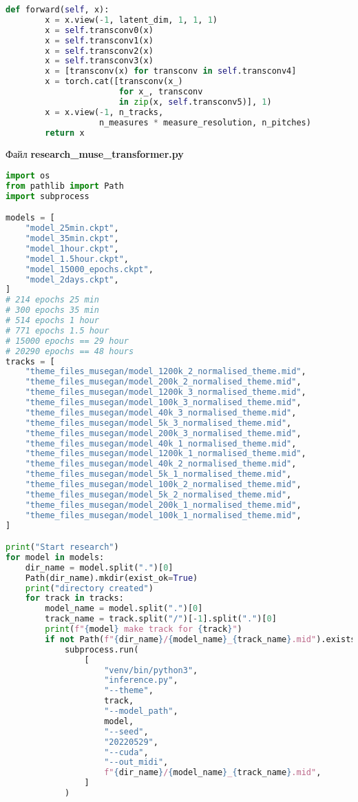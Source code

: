 \begin{lstlisting}[language=Python]
    def forward(self, x):
        x = x.view(-1, latent_dim, 1, 1, 1)
        x = self.transconv0(x)
        x = self.transconv1(x)
        x = self.transconv2(x)
        x = self.transconv3(x)
        x = [transconv(x) for transconv in self.transconv4]
        x = torch.cat([transconv(x_)
                       for x_, transconv
                       in zip(x, self.transconv5)], 1)
        x = x.view(-1, n_tracks,
                   n_measures * measure_resolution, n_pitches)
        return x

\end{lstlisting}

Файл \textbf{research\_muse\_transformer.py}

\begin{lstlisting}[language=Python]
import os
from pathlib import Path
import subprocess

models = [
    "model_25min.ckpt",
    "model_35min.ckpt",
    "model_1hour.ckpt",
    "model_1.5hour.ckpt",
    "model_15000_epochs.ckpt",
    "model_2days.ckpt",
]
# 214 epochs 25 min
# 300 epochs 35 min
# 514 epochs 1 hour
# 771 epochs 1.5 hour
# 15000 epochs == 29 hour
# 20290 epochs == 48 hours
tracks = [
    "theme_files_musegan/model_1200k_2_normalised_theme.mid",
    "theme_files_musegan/model_200k_2_normalised_theme.mid",
    "theme_files_musegan/model_1200k_3_normalised_theme.mid",
    "theme_files_musegan/model_100k_3_normalised_theme.mid",
    "theme_files_musegan/model_40k_3_normalised_theme.mid",
    "theme_files_musegan/model_5k_3_normalised_theme.mid",
    "theme_files_musegan/model_200k_3_normalised_theme.mid",
    "theme_files_musegan/model_40k_1_normalised_theme.mid",
    "theme_files_musegan/model_1200k_1_normalised_theme.mid",
    "theme_files_musegan/model_40k_2_normalised_theme.mid",
    "theme_files_musegan/model_5k_1_normalised_theme.mid",
    "theme_files_musegan/model_100k_2_normalised_theme.mid",
    "theme_files_musegan/model_5k_2_normalised_theme.mid",
    "theme_files_musegan/model_200k_1_normalised_theme.mid",
    "theme_files_musegan/model_100k_1_normalised_theme.mid",
]

print("Start research")
for model in models:
    dir_name = model.split(".")[0]
    Path(dir_name).mkdir(exist_ok=True)
    print("directory created")
    for track in tracks:
        model_name = model.split(".")[0]
        track_name = track.split("/")[-1].split(".")[0]
        print(f"{model} make track for {track}")
        if not Path(f"{dir_name}/{model_name}_{track_name}.mid").exists():
            subprocess.run(
                [
                    "venv/bin/python3",
                    "inference.py",
                    "--theme",
                    track,
                    "--model_path",
                    model,
                    "--seed",
                    "20220529",
                    "--cuda",
                    "--out_midi",
                    f"{dir_name}/{model_name}_{track_name}.mid",
                ]
            )

\end{lstlisting}

